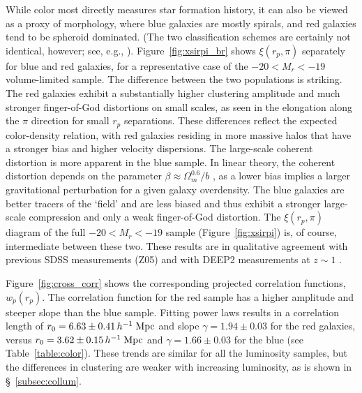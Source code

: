 \documentclass[]{emulateapj}
\newcommand{\hmpc}{\,h^{-1}\;{\rm Mpc}}
\newcommand{\wrp}{{w_p(r_p)}}
\begin{document}
While color most directly measures star formation history,
it can also be viewed as a proxy of morphology, where blue 
galaxies are mostly spirals, and red galaxies tend to be 
spheroid dominated.
(The two classification schemes are certainly not identical, however; see, e.g.,
\citealt{choi07,bamford08,blanton09,skibba09}).
%
Figure~\ref{fig:xsirpi_br} shows $\xi(r_p,\pi)$ separately for blue
and red galaxies, for a representative case of the $-20<M_r<-19$ 
volume-limited sample.  The difference between the two populations
is striking. The red galaxies exhibit a substantially higher clustering 
amplitude and much stronger finger-of-God distortions on small scales, as 
seen in the elongation along the $\pi$ direction for small $r_p$ 
separations.  These differences reflect the 
expected color-density relation, with red galaxies residing in more 
massive halos that have a stronger bias and higher velocity dispersions.
The large-scale coherent distortion is more apparent in the blue sample. 
In linear theory, the coherent distortion depends on the parameter
$\beta \approx \Omega_m^{0.6}/b$ \citep{kaiser87,hamilton98}, as a lower
bias implies a larger gravitational perturbation for a given galaxy
overdensity.  The blue galaxies are better tracers of the `field' and
are less biased and thus exhibit a stronger large-scale compression
and only a weak finger-of-God distortion.
The $\xi(r_p,\pi)$ diagram of the full $-20 < M_r < -19$ sample
(Figure~\ref{fig:xsirpi}) is, of course, intermediate between
these two.  These results are in qualitative
agreement with previous SDSS measurements
(Z05) and with DEEP2 measurements at $z\sim 1$ \citep{coil07}.

\begin{figure*}[t]%
\caption[]{\label{fig:xsirpi_br}
Contours of the galaxy correlation function as a function of tangential
separation $r_p$ and line-of-sight separation $\pi$  for the
$-20<M_r<-19$ sample, evaluated separately for red galaxies (left) and
blue galaxies (right).  Contours are the same as in Fig.~\ref{fig:xsirpi}.
}
\end{figure*}


Figure~\ref{fig:cross_corr} shows the corresponding projected
correlation functions, $\wrp$.  The  correlation function for the red
sample has a higher amplitude and steeper slope than the blue sample.
Fitting power laws
results  in  a correlation length of $r_0=6.63 \pm 0.41 \hmpc$ and slope 
$\gamma=1.94 \pm 0.03$ for the red galaxies, versus $r_0=3.62 \pm 0.15\hmpc$ 
and $\gamma=1.66 \pm 0.03$ for the blue (see Table~\ref{table:color}).
These trends are similar for all the luminosity samples, but the 
differences in clustering are weaker with increasing luminosity, as is 
shown in \S~\ref{subsec:collum}.
\end{document}
